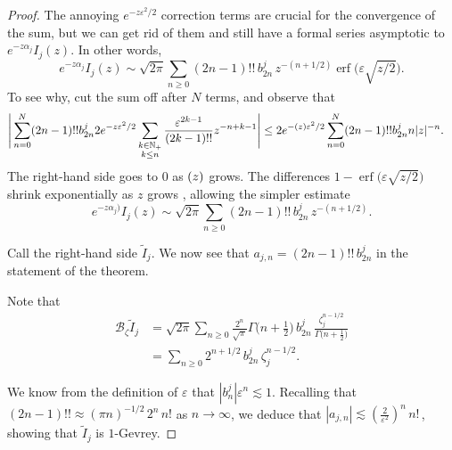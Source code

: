 \documentclass{article}
\let\Re\relax
\DeclareMathOperator{\Re}{Re}
\theoremstyle{definition}
\newcommand{\borel}{\mathcal{B}}
\begin{document}
\begin{proof}
The annoying $e^{-z\varepsilon^2/2}$ correction terms are crucial for the convergence of the sum, but we can get rid of them and still have a formal series asymptotic to $e^{-z \alpha_j} I_j(z)$. In other words,
\[ e^{-z \alpha_j} I_j(z) \sim \sqrt{2\pi} \sum_{n \ge 0} (2n-1)!!\,b_{2n}^j\,z^{-(n+1/2)} \operatorname{erf}\big(\varepsilon \sqrt{z/2}\big). \]
To see why, cut the sum off after $N$ terms, and observe that
\begin{align*}
  \Bigg | \sum_{n= 0}^N(2n-1)!! b_{2n}^j  2e^{-z\varepsilon^2/2} \sum_{\substack{k \in \mathbb{N}_+ \\ k \le n}} \frac{\varepsilon^{2k-1}}{(2k-1)!!} z^{-n+k-1} \Bigg | &\leq  2 e^{-\Re (z) \varepsilon^2/2} \sum_{n=0}^N(2n-1)!! b_{2n}^j n|z|^{-n}.
\end{align*}
The right-hand side goes to $0$ as $\Re(z)$ grows.
The differences $1 - \operatorname{erf}\big(\varepsilon \sqrt{z/2}\big)$ shrink exponentially as $z$ grows \cite[inequality~(5)]{chiani-dardari-book}, allowing the simpler estimate
\[ e^{-z\alpha_j)} I_j(z) \sim \sqrt{2\pi} \sum_{n \ge 0} (2n-1)!!\, b_{2n}^j \,z^{-(n+1/2)}. \] 

Call the right-hand side $\tilde{I}_j$. We now see that $a_{j,n} = (2n-1)!!\,b_{2n}^j$ in the statement of the theorem. %

Note that 
\begin{align*}
\borel_{\zeta} \tilde{I}_j & = \sqrt{2\pi} \sum_{n \ge 0} \frac{2^n}{\sqrt{\pi}} \Gamma\big(n+\tfrac{1}{2}\big)\,b_{2n}^j\,\frac{\zeta_j^{n-1/2}}{\Gamma\big(n+\tfrac{1}{2}\big)} \\
& = \sum_{n \ge 0} 2^{n+1/2}\,b_{2n}^j \,\zeta_j^{n-1/2}.
\end{align*}

We know from the definition of $\varepsilon$ that $\left|b_n^j\right| \varepsilon^n \lesssim 1$. Recalling that $(2n - 1)!! \approx (\pi n)^{-1/2}\,2^n\,n!$ as $n \to \infty$, we deduce that $|a_{j,n}| \lesssim \left(\tfrac{2}{\varepsilon^2}\right)^n\,n!\,$, showing that $\tilde{I}_j$ is $1$-Gevrey.


\end{proof}
\end{document}
